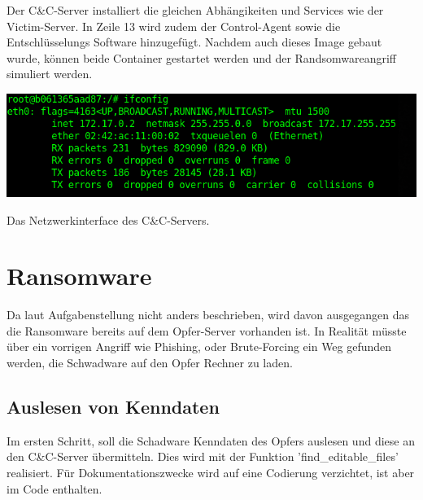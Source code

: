 \documentclass[12pt]{article}
\begin{document}
Der C\&C-Server installiert die gleichen Abhängikeiten und Services wie der Victim-Server. In Zeile 13 wird zudem der Control-Agent sowie die Entschlüsselungs Software hinzugefügt. Nachdem auch dieses Image gebaut wurde, können beide Container gestartet werden und der Randsomwareangriff simuliert werden.
\begin{center}
 \includegraphics[scale=0.3]{CIp.png}
\end{center}
Das Netzwerkinterface des C\&C-Servers.
\newpage
\section{Ransomware}

Da laut Aufgabenstellung nicht anders beschrieben, wird davon ausgegangen das die Ransomware bereits auf dem Opfer-Server vorhanden ist. In Realität müsste über ein vorrigen Angriff wie Phishing, oder Brute-Forcing ein Weg gefunden werden, die Schwadware auf den Opfer Rechner zu laden.
\subsection{Auslesen von Kenndaten}
Im ersten Schritt, soll die Schadware Kenndaten des Opfers auslesen und diese an den C\&C-Server übermitteln. Dies wird mit der Funktion 'find\_editable\_files' realisiert. Für Dokumentationszwecke wird auf eine Codierung verzichtet, ist aber im Code enthalten.
\end{document}
